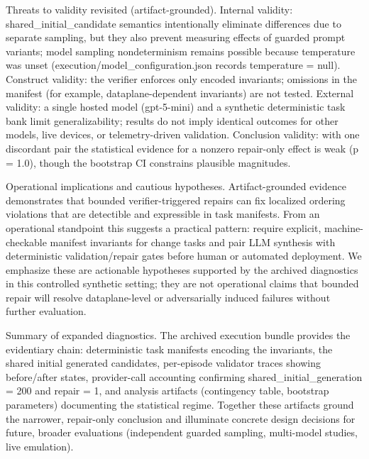 \documentclass[conference]{IEEEtran}
\begin{document}
Threats to validity revisited (artifact-grounded). Internal validity: shared\_initial\_candidate semantics intentionally eliminate differences due to separate sampling, but they also prevent measuring effects of guarded prompt variants; model sampling nondeterminism remains possible because temperature was unset (execution/model\_configuration.json records temperature = null). Construct validity: the verifier enforces only encoded invariants; omissions in the manifest (for example, dataplane-dependent invariants) are not tested. External validity: a single hosted model (gpt-5-mini) and a synthetic deterministic task bank limit generalizability; results do not imply identical outcomes for other models, live devices, or telemetry-driven validation. Conclusion validity: with one discordant pair the statistical evidence for a nonzero repair-only effect is weak (p = 1.0), though the bootstrap CI constrains plausible magnitudes.

Operational implications and cautious hypotheses. Artifact-grounded evidence demonstrates that bounded verifier-triggered repairs can fix localized ordering violations that are detectible and expressible in task manifests. From an operational standpoint this suggests a practical pattern: require explicit, machine-checkable manifest invariants for change tasks and pair LLM synthesis with deterministic validation/repair gates before human or automated deployment. We emphasize these are actionable hypotheses supported by the archived diagnostics in this controlled synthetic setting; they are not operational claims that bounded repair will resolve dataplane-level or adversarially induced failures without further evaluation.

Summary of expanded diagnostics. The archived execution bundle provides the evidentiary chain: deterministic task manifests encoding the invariants, the shared initial generated candidates, per-episode validator traces showing before/after states, provider-call accounting confirming shared\_initial\_generation = 200 and repair = 1, and analysis artifacts (contingency table, bootstrap parameters) documenting the statistical regime. Together these artifacts ground the narrower, repair-only conclusion and illuminate concrete design decisions for future, broader evaluations (independent guarded sampling, multi-model studies, live emulation).
\end{document}
